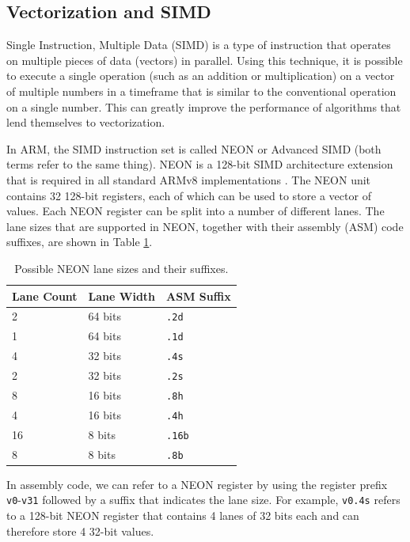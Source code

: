 \documentclass[11pt,a4paper]{report}
\theoremstyle{definition}
\begin{document}
\subsection{Vectorization and SIMD}
\label{sec:simd}
Single Instruction, Multiple Data (SIMD) is a type of instruction that operates on multiple pieces of data (vectors) in parallel. Using this technique, it is possible to execute a single operation (such as an addition or multiplication) on a vector of multiple numbers in a timeframe that is similar to the conventional operation on a single number. This can greatly improve the performance of algorithms that lend themselves to vectorization.

In ARM, the SIMD instruction set is called NEON or Advanced SIMD (both terms refer to the same thing). NEON is a 128-bit SIMD architecture extension that is required in all standard ARMv8 implementations \cite{ARMv8A-ProgrammersGuide}. The NEON unit contains 32 128-bit registers, each of which can be used to store a vector of values. Each NEON register can be split into a number of different lanes. The lane sizes that are supported in NEON, together with their assembly (ASM) code suffixes, are shown in Table \ref{tab:neonlanes}.

\begin{table}
  \centering
  \begin{tabular}{lll}
    \toprule
    \textbf{Lane Count} & \textbf{Lane Width} & \textbf{ASM Suffix} \\
    \midrule
    2 & 64 bits & \texttt{.2d} \\
    1 & 64 bits & \texttt{.1d} \\
    4 & 32 bits & \texttt{.4s} \\
    2 & 32 bits & \texttt{.2s} \\
    8 & 16 bits & \texttt{.8h} \\
    4 & 16 bits & \texttt{.4h} \\
    16 & 8 bits & \texttt{.16b} \\
    8 & 8 bits & \texttt{.8b} \\
    \bottomrule
  \end{tabular}
  \caption{Possible NEON lane sizes and their suffixes.}
  \label{tab:neonlanes}
\end{table}

In assembly code, we can refer to a NEON register by using the register prefix \texttt{v0}-\texttt{v31} followed by a suffix that indicates the lane size. For example, \texttt{v0.4s} refers to a 128-bit NEON register that contains 4 lanes of 32 bits each and can therefore store 4 32-bit values.
\end{document}
